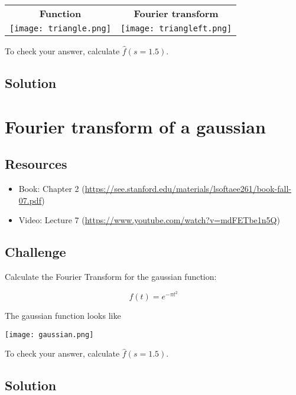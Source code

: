 \begin{tabular}{cc}
    \textbf{Function} & \textbf{Fourier transform} \\
    \texttt{[image: triangle.png]} & \texttt{[image: triangleft.png]}
\end{tabular}

To check your answer, calculate $\hat{f}(s=1.5)$.

\subsection*{Solution}

\timebox




\newpage
\section{Fourier transform of a gaussian}

\subsection*{Resources}
\begin{itemize}
    \item Book: Chapter 2 (\url{https://see.stanford.edu/materials/lsoftaee261/book-fall-07.pdf})
    \item Video: Lecture 7 (\url{https://www.youtube.com/watch?v=mdFETbe1n5Q})
\end{itemize}

\subsection*{Challenge}
Calculate the Fourier Transform for the gaussian function:

\begin{equation}
    f(t) = e^{-\pi t^2}
\end{equation}

The gaussian function looks like

\texttt{[image: gaussian.png]}

To check your answer, calculate $\hat{f}(s=1.5)$.

\subsection*{Solution}


